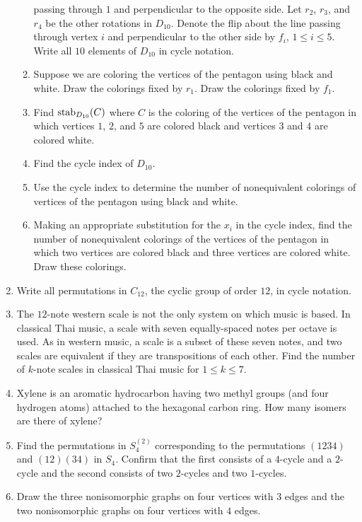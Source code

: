\begin{enumerate}
\begin{enumerate}
    passing through $1$ and perpendicular to the opposite side. Let
    $r_2$, $r_3$, and $r_4$ be the other rotations in $D_{10}$. Denote
    the flip about the line passing through vertex $i$ and
    perpendicular to the other side by $f_i$, $1\leq i\leq 5$. Write
    all $10$ elements of $D_{10}$ in cycle notation.
  \item Suppose we are coloring the vertices of the pentagon using
    black and white. Draw the colorings fixed by $r_1$. Draw the
    colorings fixed by $f_1$.
  \item Find $\operatorname{stab}_{D_{10}}(C)$ where $C$ is the coloring of the
    vertices of the pentagon in which vertices $1$, $2$, and $5$ are
    colored black and vertices $3$ and $4$ are colored white.
  \item Find the cycle index of $D_{10}$.
  \item Use the cycle index to determine the number of nonequivalent
    colorings of vertices of the pentagon using black and white.
  \item Making an appropriate substitution for the $x_i$ in the cycle
    index, find the number of nonequivalent colorings of the vertices
    of the pentagon in which two vertices are colored black and three
    vertices are colored white. Draw these colorings.
  \end{enumerate}
\item Write all permutations in $C_{12}$, the cyclic group of order
  $12$, in cycle notation.\label{ex:polya:cyclic12}
\item The $12$-note western scale is not the only system on which
  music is based. In classical Thai music, a scale with seven
  equally-spaced notes per octave is used. As in western music, a
  scale is a subset of these seven notes, and two scales are
  equivalent if they are transpositions of each other. Find the number
  of $k$-note scales in classical Thai music for $1\leq k\leq 7$.
\item Xylene is an aromatic hydrocarbon having two methyl groups (and
  four hydrogen atoms) attached to the hexagonal carbon ring. How many
  isomers are there of xylene?
\item Find the permutations in $S_4^{(2)}$ corresponding to the
  permutations $(1234)$ and $(12)(34)$ in $S_4$. Confirm that the
  first consists of a $4$-cycle and a $2$-cycle and the second
  consists of two $2$-cycles and two $1$-cycles.\label{ex:polya:perm-pairs}
\item Draw the three nonisomorphic graphs on four vertices with $3$
  edges and the two nonisomorphic graphs on four vertices with $4$ edges.

\end{enumerate}
